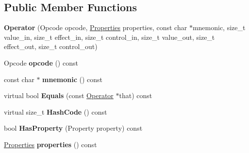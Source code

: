 \subsection*{Public Member Functions}
\begin{DoxyCompactItemize}
\item 
{\bfseries Operator} (Opcode opcode, \hyperlink{classv8_1_1base_1_1_flags}{Properties} properties, const char $\ast$mnemonic, size\+\_\+t value\+\_\+in, size\+\_\+t effect\+\_\+in, size\+\_\+t control\+\_\+in, size\+\_\+t value\+\_\+out, size\+\_\+t effect\+\_\+out, size\+\_\+t control\+\_\+out)\hypertarget{classv8_1_1internal_1_1compiler_1_1_operator_acc2f4b9a63bafed89965702360034cef}{}\label{classv8_1_1internal_1_1compiler_1_1_operator_acc2f4b9a63bafed89965702360034cef}

\item 
Opcode {\bfseries opcode} () const \hypertarget{classv8_1_1internal_1_1compiler_1_1_operator_a1778c8bb076c44bcc34be7e8897f7b67}{}\label{classv8_1_1internal_1_1compiler_1_1_operator_a1778c8bb076c44bcc34be7e8897f7b67}

\item 
const char $\ast$ {\bfseries mnemonic} () const \hypertarget{classv8_1_1internal_1_1compiler_1_1_operator_aff0cd35724bca8dbb37c2bb1483aff0b}{}\label{classv8_1_1internal_1_1compiler_1_1_operator_aff0cd35724bca8dbb37c2bb1483aff0b}

\item 
virtual bool {\bfseries Equals} (const \hyperlink{classv8_1_1internal_1_1compiler_1_1_operator}{Operator} $\ast$that) const \hypertarget{classv8_1_1internal_1_1compiler_1_1_operator_a4a05b0cf1c4a6c48b67433696bf48508}{}\label{classv8_1_1internal_1_1compiler_1_1_operator_a4a05b0cf1c4a6c48b67433696bf48508}

\item 
virtual size\+\_\+t {\bfseries Hash\+Code} () const \hypertarget{classv8_1_1internal_1_1compiler_1_1_operator_a30372620310126825e12d31efa84add8}{}\label{classv8_1_1internal_1_1compiler_1_1_operator_a30372620310126825e12d31efa84add8}

\item 
bool {\bfseries Has\+Property} (Property property) const \hypertarget{classv8_1_1internal_1_1compiler_1_1_operator_ae459aa7cc7501c9f6225a3759b4457c8}{}\label{classv8_1_1internal_1_1compiler_1_1_operator_ae459aa7cc7501c9f6225a3759b4457c8}

\item 
\hyperlink{classv8_1_1base_1_1_flags}{Properties} {\bfseries properties} () const \hypertarget{classv8_1_1internal_1_1compiler_1_1_operator_a489ed3c677b8e93d76e11ab93ad18a73}{}\label{classv8_1_1internal_1_1compiler_1_1_operator_a489ed3c677b8e93d76e11ab93ad18a73}


\end{DoxyCompactItemize}
